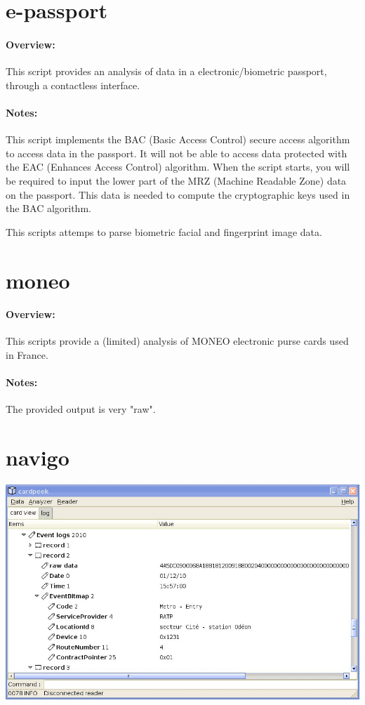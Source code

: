 \documentclass[11pt]{report}
\begin{document}
\section{e-passport}

\paragraph{Overview:}
This script provides an analysis of data in a electronic/biometric passport, through a contactless interface.

\paragraph{Notes:}
This script implements the BAC (Basic Access Control) secure access algorithm to access data in the passport. 
It will not be able to access data protected with the EAC (Enhances Access Control) algorithm.
When the script starts, you will be required to input the lower part of the MRZ (Machine Readable Zone) data on the passport. 
This data is needed to compute the cryptographic keys used in the BAC algorithm.

This scripts attemps to parse biometric facial and fingerprint image data.

\section{moneo}

\paragraph{Overview:}
This scripts provide a (limited) analysis of MONEO electronic purse cards used in France.

\paragraph{Notes:}
The provided output is very "raw".

\section{navigo}

\begin{center}
\includegraphics[width=.75\textwidth]{graphics/sample-navigo.jpg}
\end{center}
\end{document}
